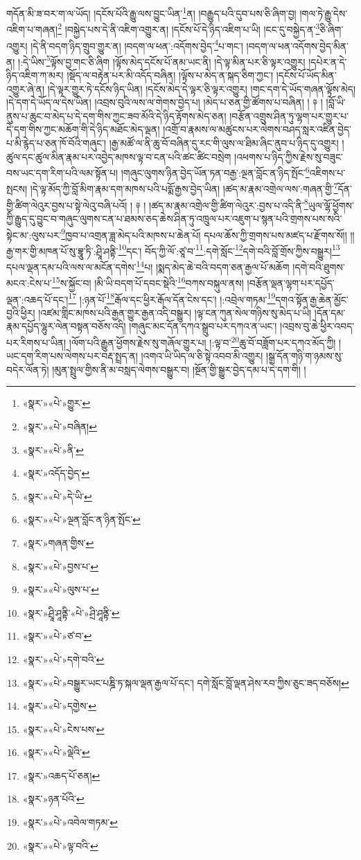 གདོན་མི་ཟ་བར་ག་ལ་ཡོད། །དངོས་པོའི་རྒྱུ་ལས་བྱུང་ཡིན་\footnote{«སྣར་»«པེ་»གྱུར་}ན། །བརྒྱུད་པའི་དུབ་པས་ཅི་ཞིག་བྱ། །གལ་ཏེ་རྒྱུ་དེས་འཇིག་པ་གཞན།\footnote{«སྣར་»«པེ་»བཞིན།} །བསྐྱེད་པས་དེ་ནི་འཇིག་འགྱུར་ན། །དངོས་པོ་དེ་ཉིད་འཇིག་པ་ཡི། །ངང་དུ་བསྐྱེད་ན་\footnote{«སྣར་»«པེ་»ནི་}ཅི་ཞིག་འགྱུར། །དེ་ནི་བདག་ཉིད་གྲུབ་གྱུར་ན། །བདག་ལ་ཕན་:འདོགས་བྱེད་\footnote{«སྣར་»འདོད་བྱེད་}པ་གང་། །བདག་ལ་ཕན་འདོགས་བྱེད་མིན་ན། །:དེ་ཡིས་\footnote{«སྣར་»«པེ་»དེ་ཡི་}ལྟོས་བྱ་གང་ཅི་ཞིག །ལྟོས་མེད་དངོས་པོ་ནམ་ཡང་ནི། །དེ་ལྟ་མིན་པར་ཅི་ལྟར་འགྱུར། །དཔེར་ན་དེ་ཉིད་འཇིག་ཀ་མར། །སྡོད་ལ་བརྟེན་པར་མི་འདོད་བཞིན། །ལྟོས་པ་མེད་ན་སྐད་ཅིག་ཀྱང་། །དངོས་པོ་ཡོད་མིན་འགྱུར་ཞེ་ན། །དེ་ལྟར་གྱུར་ཏེ་དངོས་ཉིད་ཡིན། །དངོས་མེད་དེ་ལྟར་ཅི་ལྟར་འགྱུར། །གང་དག་དེ་ཡོད་གཞན་ལྟོས་མེད། །དེ་དག་དེ་ཡོད་ལ་དེས་ཡིན། །འབྲས་བུའི་ལས་ལ་གེགས་བྱེད་པ། །མེད་པ་ཅན་གྱི་ཚོགས་པ་བཞིན། ། ༈ ། །བློ་ཡི་ནུས་པ་ཆུང་བ་མེད་པ་དེ་དག་གིས་ཀྱང་ཟབ་མོའི་དེ་ཉིད་རྟོགས་མེད་ཅན། །བརྩོན་འགྲུས་ཤིན་ཏུ་ལྷག་པར་གྱུར་པ་དེ་དག་གིས་ཀྱང་མཆོག་གི་དེ་ཉིད་མཐོང་མེད་ལྡན། །འགྲོ་བ་རྣམས་ལ་མཚུངས་པར་ལེགས་བཤད་སླར་འཛིན་བྱེད་པ་མི་རྙེད་པ་ཅན་ཁོ་བོའི་གཞུང་། །རྒྱ་མཚོ་ལ་ནི་ཆུ་བོ་བཞིན་དུ་རང་གི་ལུས་ལ་ཐིམ་ཞིང་ནུབ་པ་ཉིད་དུ་འགྱུར། །ཚུལ་དང་ཚུལ་མིན་རྣམ་པར་འབྱེད་མཁས་ལྟ་བ་ངན་པའི་ཚང་ཚིང་བསྲེག །འཕགས་པ་ཉིད་ཀྱིས་རྗེས་སུ་བཟུང་བས་ཡང་དག་རིག་པའི་ལམ་སྟོན་པ། །གཞུང་ལུགས་ཉིན་བྱེད་ཡོན་ཏན་བརྒྱ་:ལྔན་བློང་ན་ཉིད་སྤོང་\footnote{«སྣར་»«པེ་»ལྔན་བློང་ན་ཉིན་སྤོང་}འཇིགས་པ་སྤངས། །དེ་ལྟ་མོད་ཀྱི་བློ་མིག་རྣམ་དག་མཁས་པའི་པདྨོ་རྒྱས་བྱེད་ཡིན། །ཚད་མ་རྣམ་འགྲེལ་ལས་:གཞན་གྱི་\footnote{«སྣར་»གཞན་གྱིས་}དོན་གྱི་ཚིག་ལེའུར་བྱས་པ་སྟེ་ལེའུ་བཞི་པའོ། ། ༈ ། །ཚད་མ་རྣམ་འགྲེལ་གྱི་ཚིག་ལེའུར་:བྱས་པ་འདི་ནི་\footnote{«སྣར་»«པེ་»བྱས་པ་}ཡུལ་ལྷོ་ཕྱོགས་ཀྱི་རྒྱུད་དུ་བྱུང་བ་གཞུང་ལུགས་ངན་པ་ཐམས་ཅད་ཆེས་ཤིན་ཏུ་འཁྲུལ་པར་འཇུག་པ་སྙན་པའི་གྲགས་པས་སའི་སྟེང་མ་:ལུས་པར་\footnote{«སྣར་»«པེ་»ལུས་པ་}ཁྱབ་པ་འགྲན་ཟླ་མེད་པའི་མཁས་པ་ཆེན་པོ། དཔལ་ཆོས་ཀྱི་གྲགས་པས་མཛད་པ་རྫོགས་སོ།། །།རྒྱ་གར་གྱི་མཁན་པོ་སུ་བྷཱུ་ཏི་:ཤྲཱི་ཤནྟི་\footnote{«སྣར་»ཤྲཱི་ཤཱནྟི་«པེ་»ཤྲི་ཤཱནྟི་}དང་། བོད་ཀྱི་ལོ་:ཙཱ་བ་\footnote{«སྣར་»«པེ་»ཙ་བ་}:དགེ་སློང་\footnote{«སྣར་»«པེ་»དགེ་བའི་}དགེ་བའི་བློ་གྲོས་ཀྱིས་བསྒྱུར།\footnote{«སྣར་»«པེ་»བསྒྱུར་ཡང་པཎྜི་ཏ་སྐལ་ལྡན་རྒྱལ་པོ་དང་། དགེ་སློང་བློ་ལྡན་ཤེས་རབ་ཀྱིས་ཅུང་ཟད་བཅོས།} དཔལ་ལྡན་དམ་པའི་ལས་ལ་མངོན་དགེས་\footnote{«སྣར་»«པེ་»དགྱེས་}པ། །སྨད་མེད་ཆེ་བའི་བདག་ཅན་རྒྱལ་པོ་མཆོག །དགེ་བའི་ཐུགས་མངའ་:ངེས་པ་\footnote{«སྣར་»«པེ་»ངེས་པས་}ས་སྐྱོང་བ། །མི་ཡི་བདག་པོ་དབང་སྡེའི་\footnote{«སྣར་»«པེ་»ལྡེའི་}བཀས་བསྐུལ་ནས། །བརྩོན་ལྡན་ལྷག་པར་དཔྱོད་ལྡན་:འཆད་པོ་དང་།\footnote{«སྣར་»འཆད་པོ་ཅན།} །:ཉན་པོ་\footnote{«སྣར་»ཉན་པོའི་}རྒོལ་དང་ཕྱིར་རྒོལ་དོན་ངེས་དང་། །:འབྲེལ་གཏམ་\footnote{«སྣར་»«པེ་»འབེལ་གཏམ་}དགའ་སྟོན་རྒྱ་ཆེན་མྱོང་བྱའི་ཕྱིར། །འཛམ་གླིང་མཁས་པའི་རྒྱན་གྱུར་རྒྱན་འདི་བསྒྱུར། །ལྟ་ངན་ཀུན་སེལ་གཉིས་སུ་མེད་པ་ཡི། །དོན་དམ་རྣམ་དཔྱོད་ལྷུར་ལེན་བསྟན་བཅོས་འདི། །གཞུང་མང་དོན་དཀའ་སྒྲུབ་པར་དཀའ་ན་ཡང་། །འབྲས་བུ་ཆེ་ཕྱིར་འབད་པར་རིགས་པ་ཡིན། །ལོག་པའི་རྒྱུན་ཕྱོགས་རྗེས་སུ་གཞོལ་གྱུར་པ། །:ལྟ་བ་\footnote{«སྣར་»«པེ་»ལྟ་བའི་}ཆུ་བོ་བཟློག་པར་དཀའ་མོད་ཀྱི། །ཡང་དག་རིག་པས་ལེགས་པར་བརྡ་སྤྲད་ན། །འགའ་ཡི་ཡིད་ལ་ཅི་སྟེ་འབབ་མི་འགྱུར། །སྒྲ་དོན་གཉི་ག་ཉམས་སུ་བདེར་ལོན་ཏེ། །མུན་སྤྲུལ་གྱིས་ནི་མ་བསླད་ལེགས་བསྒྱུར་བ། །སྔོན་གྱི་སྒྱུར་བྱེད་དམ་པ་དེ་དག་གི། །
